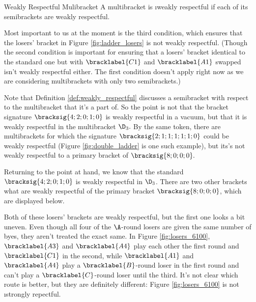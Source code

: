 {    \begin{definition}{Weakly Respectful Mulibracket}{}
        A multibracket is \i{weakly respectful} if each of its semibrackets are weakly respectful.
    \end{definition}


    Most important to us at the moment is the third condition, which ensures that the losers' bracket in Figure \ref{fig:ladder_losers} is not weakly respectful. (Though the second condition is important for ensuring that a losers' bracket identical to the standard one but with $\bracklabel{C1}$ and $\bracklabel{A1}$ swapped isn't weakly respectful either. The first condition doesn't apply right now as we are considering multibrackets with only two semibrackets.)

    Note that Definition \ref{def:weakly_respectful} discusses a semibracket with respect to the multibracket that it's a part of. So the point is not that the bracket signature $\bracksig{4;2;0;1;0}$ is weakly respectful in a vacuum, but that it is weakly respectful in the multibracket $\D_3.$ By the same token, there are multibrackets for which the signature $\bracksig{2;1;1;1;1;1;0}$ could be weakly respectful (Figure \ref{fig:double_ladder} is one such example), but its's not weakly respectful to a primary bracket of $\bracksig{8;0;0;0}.$


    Returning to the point at hand, we know that the standard $\bracksig{4;2;0;1;0}$ is weakly respectful in $\D_3$. There are two other brackets what are weakly respectful of the primary bracket $\bracksig{8;0;0;0}$, which are displayed below.


    Both of these losers' brackets are weakly respectful, but the first one looks a bit uneven. Even though all four of the $\A$-round losers are given the same number of byes, they aren't treated the exact same. In Figure \ref{fig:losers_6100}, $\bracklabel{A3}$ and $\bracklabel{A4}$ play each other the first round and $\bracklabel{C1}$ in the second, while $\bracklabel{A1}$ and $\bracklabel{A4}$ play a $\bracklabel{B}$-round loser in the first round and can't play a $\bracklabel{C}$-round loser until the third. It's not clear which route is better, but they are definitely different: Figure \ref{fig:losers_6100} is not \i{strongly repectful}.

}
